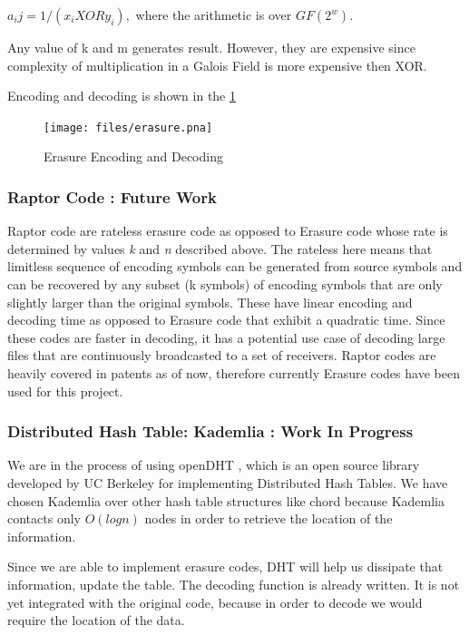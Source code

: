\documentclass[conference]{IEEEtran}
\begin{document}
$a_ij = 1/(x_i XOR y_i),$
where the arithmetic is over $GF(2^w)$.

Any value of k and m generates result. However, they are expensive since
complexity of multiplication in a Galois Field \cite{gfcomplete} is more expensive then XOR. 

Encoding and decoding is shown in the \ref{image: fig3}

\begin{figure}
    \texttt{[image: files/erasure.pna]}
    \centering
    \caption{Erasure Encoding and Decoding }
    \label{image: fig3}
\end{figure}

\subsubsection{Raptor Code \cite{raptor} : Future Work}
Raptor code are rateless erasure code as opposed to Erasure code whose rate is determined by
values \textit{k} and \textit{n} described above. The rateless here means that limitless sequence of encoding
symbols can be generated from source symbols and can be recovered by any subset (k symbols) of 
encoding symbols that are only slightly larger than the original symbols. These have linear encoding and decoding time
as opposed to Erasure code that exhibit a quadratic time. 
Since these codes are faster in decoding, it has a potential use case of decoding large files that are continuously
broadcasted to a set of receivers.
Raptor codes are heavily covered in patents as of now, therefore currently Erasure codes have been used for this project.



\subsubsection{Distributed Hash Table: Kademlia : Work In Progress }
We are in the process of using openDHT \cite{opendht}, which is an open source library
developed by UC Berkeley for implementing Distributed Hash Tables. We have chosen Kademlia over other
hash table structures like chord because Kademlia contacts only $O(log n)$ nodes in order
to retrieve the location of the information.

Since we are able to implement erasure codes, DHT will help us dissipate that information, update the table.
The decoding function is already written. It is not yet integrated with the original code, because in order to
decode we would require the location of the data.
\end{document}
